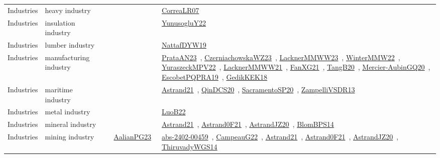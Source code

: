 {\begin{longtable}{lp{3cm}>{\raggedright\arraybackslash}p{6cm}>{\raggedright\arraybackslash}p{6cm}>{\raggedright\arraybackslash}p{8cm}}
Industries & heavy industry &  &  & \href{../works/CorreaLR07.pdf}{CorreaLR07}~\cite{CorreaLR07}\\
Industries & insulation industry &  &  & \href{../works/YunusogluY22.pdf}{YunusogluY22}~\cite{YunusogluY22}\\
Industries & lumber industry &  &  & \href{../works/NattafDYW19.pdf}{NattafDYW19}~\cite{NattafDYW19}\\
Industries & manufacturing industry &  &  & \href{../works/PrataAN23.pdf}{PrataAN23}~\cite{PrataAN23}, \href{../works/CzerniachowskaWZ23.pdf}{CzerniachowskaWZ23}~\cite{CzerniachowskaWZ23}, \href{../works/LacknerMMWW23.pdf}{LacknerMMWW23}~\cite{LacknerMMWW23}, \href{../works/WinterMMW22.pdf}{WinterMMW22}~\cite{WinterMMW22}, \href{../works/YuraszeckMPV22.pdf}{YuraszeckMPV22}~\cite{YuraszeckMPV22}, \href{../works/LacknerMMWW21.pdf}{LacknerMMWW21}~\cite{LacknerMMWW21}, \href{../works/FanXG21.pdf}{FanXG21}~\cite{FanXG21}, \href{../works/TangB20.pdf}{TangB20}~\cite{TangB20}, \href{../works/Mercier-AubinGQ20.pdf}{Mercier-AubinGQ20}~\cite{Mercier-AubinGQ20}, \href{../works/EscobetPQPRA19.pdf}{EscobetPQPRA19}~\cite{EscobetPQPRA19}, \href{../works/GedikKEK18.pdf}{GedikKEK18}~\cite{GedikKEK18}\\
Industries & maritime industry &  &  & \href{../works/Astrand21.pdf}{Astrand21}~\cite{Astrand21}, \href{../works/QinDCS20.pdf}{QinDCS20}~\cite{QinDCS20}, \href{../works/SacramentoSP20.pdf}{SacramentoSP20}~\cite{SacramentoSP20}, \href{../works/ZampelliVSDR13.pdf}{ZampelliVSDR13}~\cite{ZampelliVSDR13}\\
Industries & metal industry &  &  & \href{../works/LuoB22.pdf}{LuoB22}~\cite{LuoB22}\\
Industries & mineral industry &  &  & \href{../works/Astrand21.pdf}{Astrand21}~\cite{Astrand21}, \href{../works/Astrand0F21.pdf}{Astrand0F21}~\cite{Astrand0F21}, \href{../works/AstrandJZ20.pdf}{AstrandJZ20}~\cite{AstrandJZ20}, \href{../works/BlomBPS14.pdf}{BlomBPS14}~\cite{BlomBPS14}\\
Industries & mining industry &  & \href{../works/AalianPG23.pdf}{AalianPG23}~\cite{AalianPG23} & \href{../works/abs-2402-00459.pdf}{abs-2402-00459}~\cite{abs-2402-00459}, \href{../works/CampeauG22.pdf}{CampeauG22}~\cite{CampeauG22}, \href{../works/Astrand21.pdf}{Astrand21}~\cite{Astrand21}, \href{../works/Astrand0F21.pdf}{Astrand0F21}~\cite{Astrand0F21}, \href{../works/AstrandJZ20.pdf}{AstrandJZ20}~\cite{AstrandJZ20}, \href{../works/ThiruvadyWGS14.pdf}{ThiruvadyWGS14}~\cite{ThiruvadyWGS14}\\

\end{longtable}}
